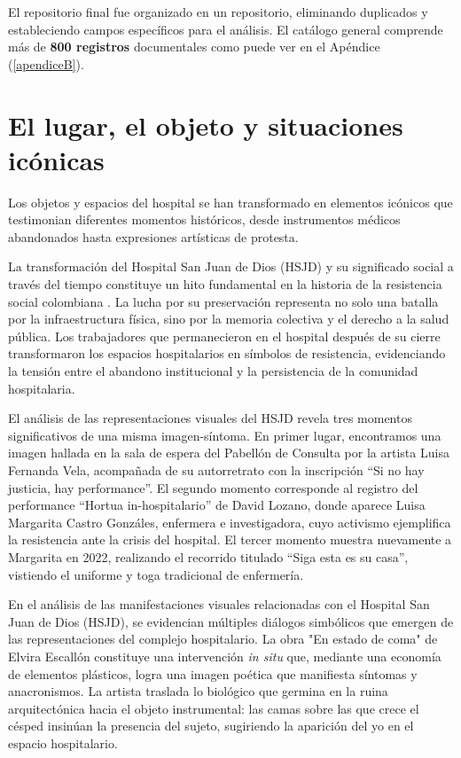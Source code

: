 El repositorio final fue organizado en un repositorio, eliminando duplicados y estableciendo campos específicos para el análisis. El catálogo general comprende más de \textbf{800 registros} documentales como puede ver en el Apéndice (\ref{apendiceB}).


\section{El lugar, el objeto y situaciones icónicas}

Los objetos y espacios del hospital se han transformado en elementos icónicos que testimonian diferentes momentos históricos, desde instrumentos médicos abandonados hasta expresiones artísticas de protesta.

La transformación del Hospital San Juan de Dios (HSJD) y su significado social a través del tiempo constituye un hito fundamental en la historia de la resistencia social colombiana \parencite{Gongora2013}. La lucha por su preservación representa no solo una batalla por la infraestructura física, sino por la memoria colectiva y el derecho a la salud pública. Los trabajadores que permanecieron en el hospital después de su cierre transformaron los espacios hospitalarios en símbolos de resistencia, evidenciando la tensión entre el abandono institucional y la persistencia de la comunidad hospitalaria.

El análisis de las representaciones visuales del HSJD revela tres momentos significativos de una misma imagen-síntoma. En primer lugar, encontramos una imagen hallada en la sala de espera del Pabellón de Consulta por la artista Luisa Fernanda Vela, acompañada de su autorretrato con la inscripción \enquote{Si no hay justicia, hay performance}. El segundo momento corresponde al registro del performance \enquote{Hortua in-hospitalario} de David Lozano, donde aparece Luisa Margarita Castro Gonzáles, enfermera e investigadora, cuyo activismo ejemplifica la resistencia ante la crisis del hospital. El tercer momento muestra nuevamente a Margarita en 2022, realizando el recorrido titulado \enquote{Siga esta es su casa}, vistiendo el uniforme y toga tradicional de enfermería.

En el análisis de las manifestaciones visuales relacionadas con el Hospital San Juan de Dios (HSJD), se evidencian múltiples diálogos simbólicos que emergen de las representaciones del complejo hospitalario. La obra "En estado de coma" de Elvira Escallón constituye una intervención \textit{in situ} que, mediante una economía de elementos plásticos, logra una imagen poética que manifiesta síntomas y anacronismos. La artista traslada lo biológico que germina en la ruina arquitectónica hacia el objeto instrumental: las camas sobre las que crece el césped insinúan la presencia del sujeto, sugiriendo la aparición del yo en el espacio hospitalario.

